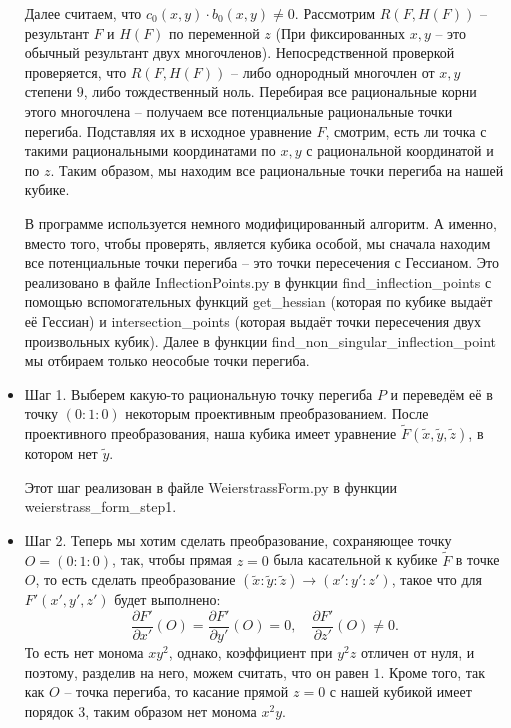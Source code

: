 \begin{itemize}[leftmargin=0.6cm]
    Далее считаем, что \(c_0(x, y) \cdot b_0(x, y) \ne 0\). Рассмотрим
    \(R(F, H(F))\) -- результант \(F\) и \(H(F)\) по переменной \(z\) (При
    фиксированных \(x, y\) -- это обычный результант двух многочленов).
    Непосредственной проверкой проверяется, что \(R(F, H(F))\) --
    либо однородный многочлен от \(x, y\) степени \(9\), либо
    тождественный ноль. Перебирая все рациональные корни этого многочлена
    -- получаем все потенциальные рациональные точки перегиба. Подставляя
    их в исходное уравнение \(F\), смотрим, есть ли точка с такими
    рациональными координатами по \(x, y\) с рациональной координатой и по
    \(z\). Таким образом, мы находим все рациональные точки перегиба на
    нашей кубике. 
    
    В программе используется немного модифицированный алгоритм. А именно,
    вместо того, чтобы проверять, является кубика особой, мы сначала находим
    все потенциальные точки перегиба -- это точки пересечения с Гессианом. Это
    реализовано в файле \textsf{InflectionPoints.py} в функции
    \textsf{find\_inflection\_points} с помощью вспомогательных функций
    \textsf{get\_hessian} (которая по кубике выдаёт её Гессиан) и
    \textsf{intersection\_points} (которая выдаёт точки пересечения двух
    произвольных кубик). Далее в функции
    \textsf{find\_non\_singular\_inflection\_point} мы отбираем только
    неособые точки перегиба.

    \item Шаг 1. Выберем какую-то рациональную точку перегиба \(P\) и
    переведём её в точку \((0 : 1 : 0)\) некоторым проективным
    преобразованием. После проективного преобразования, наша кубика имеет
    уравнение \(\widetilde{F}(\widetilde{x}, \widetilde{y}, \widetilde{z})\),
    в котором нет \(\widetilde{y}\). 

    Этот шаг реализован в файле \textsf{WeierstrassForm.py} в функции
    \textsf{weierstrass\_form\_step1}.


    \item Шаг 2. Теперь мы хотим сделать преобразование,
    сохраняющее точку \(O = (0 : 1 : 0)\), так, чтобы
    прямая \(z = 0\) была касательной к кубике \(\widetilde{F}\) в точке
    \(O\), то есть сделать преобразование \((\widetilde{x} :
    \widetilde{y} : \widetilde{z}) \to (x' : y' : z')\), такое что
    для \(F'(x', y', z')\) будет выполнено: 
     \[
    \frac{\partial F'}{\partial x'} (O) = \frac{\partial F'}{\partial y'}
    (O) = 0, \quad \frac{\partial F'}{\partial z'} (O) \ne 0
    .\]
    То есть нет монома \(x y^2\), однако, коэффициент при \(y^2 z\) отличен от
    нуля, и поэтому, разделив на него, можем считать, что он равен \(1\).
    Кроме того, так как \(O\) -- точка перегиба, то касание прямой \(z = 0\) с
    нашей кубикой имеет порядок 3, таким образом нет монома \(x^2 y\). 
    

\end{itemize}
